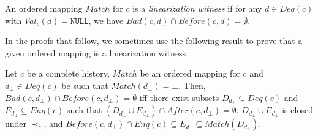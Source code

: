 \documentclass{LMCS}
\newcommand{\NULL}{\ensuremath{\mathtt{NULL}}}
\newcommand{\Match}{\ensuremath{\mathit{Match}}}
\newcommand{\Deq}[1]{\ensuremath{\mathit{Deq}({#1})}}
\newcommand{\Enq}[1]{\ensuremath{\mathit{Enq}({#1})}}
\newcommand{\Before}[2]{\ensuremath{\mathit{Before}({#1},{#2})}}
\newcommand{\After}[2]{\ensuremath{\mathit{After}({#1},{#2})}}
\newcommand{\Val}[2]{\ensuremath{\mathit{Val}_{#1}({#2})}}
\newcommand{\Bad}[2]{\ensuremath{\mathit{Bad}(#1,#2)}}
\newcommand{\dhat}{\ensuremath{d_{\bot}}}
\newcommand{\Dhat}{\ensuremath{D_{\dhat}}}
\newcommand{\Ehat}{\ensuremath{E_{\dhat}}}
\newcommand\mylabel[1]{\label{#1}}
\begin{document}
\begin{defi}\mylabel{def:lin-witness}
An ordered mapping $\Match$ for $c$ is a {\em linearization witness} if for any $d\in \Deq c$ with $\Val c d=\NULL$, we have $\Bad c d\cap \Before c d=\emptyset$.
\end{defi}

In the proofs that follow, we sometimes use the following result to prove that a given ordered mapping is a linearization witness.
\begin{lem}\mylabel{lem:alt-lin-witness}
Let $c$ be a complete history, $\Match$ be an ordered mapping for $c$ and $\dhat\in \Deq c$ be such that $\Match(\dhat)=\bot$.
Then, $\Bad c \dhat\cap \Before c \dhat=\emptyset$ iff there exist subsets $\Dhat\subseteq \Deq c$ and $\Ehat\subseteq \Enq c$ such that $(\Dhat\cup \Ehat)\cap \After c \dhat= \emptyset$, $\Dhat\cup \Ehat$ is closed under $\prec_c$, and $\Before c \dhat\cap \Enq c\subseteq \Ehat\subseteq \Match(\Dhat)$.
\end{lem}

\proof\hfill
\end{document}
